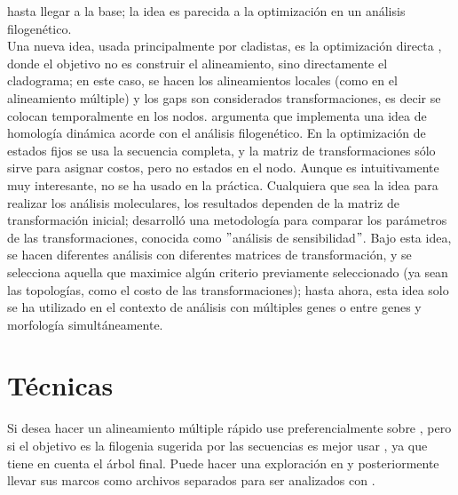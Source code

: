 hasta llegar a la base; la idea es parecida a la optimizaci\'on en un an\'alisis filogen\'etico.\\
Una nueva idea, usada principalmente por cladistas, es la optimizaci\'on directa \citep{Wheeler1996}, donde el 
objetivo no es construir el alineamiento, sino directamente el cladograma; en este caso, se hacen los alineamientos locales 
(como en el alineamiento m\'ultiple) y los gaps son considerados transformaciones, es decir se colocan temporalmente en 
los nodos. \cite{Wheeler1996} argumenta que implementa una idea de homolog\'ia din\'amica acorde con el an\'alisis filogen\'etico. 
En la optimizaci\'on de estados fijos \citep{Wheeler1999} se usa la secuencia completa, y la matriz de transformaciones s\'olo 
sirve para asignar costos, pero no estados en el nodo.  Aunque es intuitivamente muy 
interesante, no se ha usado en la pr\'actica. Cualquiera que sea la idea para realizar los an\'alisis moleculares, los 
resultados dependen de la matriz de transformaci\'on inicial; \cite{Wheeler1995} desarroll\'o una metodolog\'ia para comparar 
los par\'ametros de las transformaciones, conocida como $"$an\'alisis de sensibilidad$"$.
Bajo esta idea, se hacen diferentes an\'alisis con diferentes matrices de transformaci\'on, y se selecciona aquella que 
maximice alg\'un criterio previamente seleccionado (ya sean las topolog\'ias, como el costo de las transformaciones); hasta 
ahora, esta idea solo se ha utilizado en el contexto de an\'alisis con m\'ultiples genes o entre genes y morfolog\'ia 
simult\'aneamente.

\section*{T\'ecnicas}

Si desea hacer un alineamiento m\'ultiple r\'apido use preferencialmente  sobre , pero si el objetivo es la filogenia sugerida por las secuencias es mejor usar  , ya que  tiene en cuenta el \'arbol final. Puede hacer una  exploraci\'on en  y posteriormente llevar sus marcos como archivos separados para ser analizados con .

